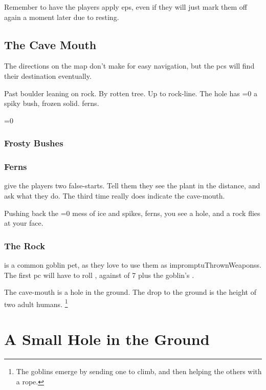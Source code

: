 \begin{multicols}{2}
Remember to have the players apply \glspl{ep}, even if they will just mark them off again a moment later due to resting.

\subsection{The Cave Mouth}

The directions on the map don't make for easy navigation, but the \glspl{pc} will find their destination eventually.

\begin{exampletext}
  Past boulder leaning on rock.
  By rotten tree.
  Up to rock-line.
  The hole has
  \ifnum\value{temperature}=0
    a spiky bush, frozen solid.
  \else
    ferns.
  \fi
\end{exampletext}

\ifnum\value{temperature}=0
  \subsubsection{Frosty Bushes}
\else
  \subsubsection{Ferns}
\fi
give the players two false-starts.
Tell them they see the plant in the distance, and ask what they do.
The third time really does indicate the cave-mouth.

\begin{boxtext}
  Pushing back the
  \ifnum\value{temperature}=0%
    mess of ice and spikes,
  \else%
    ferns,
  \fi%
  you see a hole, and a rock flies at your face.
\end{boxtext}

\subsubsection{The Rock}
is a common goblin pet, as they love to use them as \glspl{impromptuThrownWeapons}.
The first \gls{pc} will have to roll , against  of 7 plus the goblin's .

The cave-mouth is a hole in the ground.
The drop to the ground is the height of two adult humans.%
\footnote{The goblins emerge by sending one to climb, and then helping the others with a rope.}

\end{multicols}

\needspace{15em}
\section{A Small Hole in the Ground}
\renewcommand\npcsymbol{\gls{night}}

